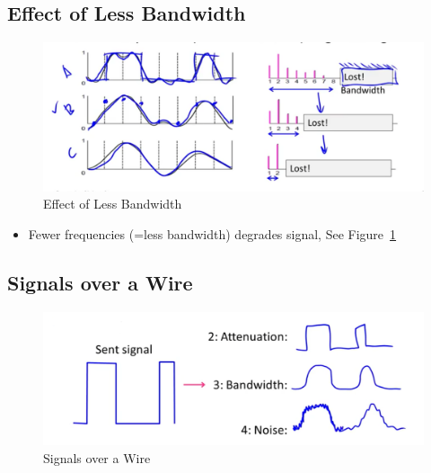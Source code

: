 \documentclass[12pt]{ctexart}   %
\begin{document}
	\subsection{Effect of Less Bandwidth}
	\begin{figure}[h!] %
	 \centering
	 \includegraphics[scale=0.7]{images/2-3-3}
	\caption{ Effect of Less Bandwidth}
	 \label{fig:2-3-3}
	 \end{figure}
	 
	 \begin{itemize}
	 	\item Fewer frequencies (=less bandwidth) degrades signal, See Figure~\ref{fig:2-3-3}
	 \end{itemize}
	 
	 \subsection{Signals over a Wire}
	 
	 \begin{figure}[h!] %
	 \centering
	 \includegraphics[scale=0.7]{images/2-3-4}
	\caption{ Signals over a Wire}
	 \label{fig:2-3-4}
	 \end{figure}
	 
\end{document}
